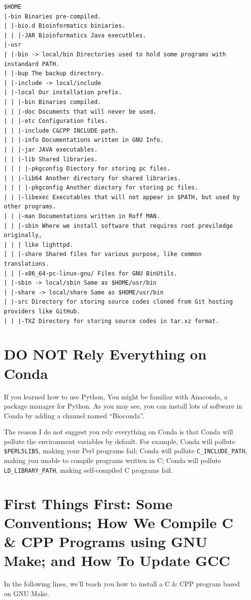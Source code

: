 \documentclass[]{article}
\begin{document}
\begin{verbatim}
$HOME
|-bin Binaries pre-compiled.
| |-bio.d Bioinformatics biniaries.
| | |-JAR Bioinformatics Java executbles.
|-usr
| |-bin -> local/bin Directories used to hold some programs with instandard PATH.
| |-bup The backup directory.
| |-include -> local/include
| |-local Our installation prefix.
| | |-bin Binaries compiled.
| | |-doc Documents that will never be used.
| | |-etc Configuration files.
| | |-include C&CPP INCLUDE path.
| | |-info Documentations written in GNU Info.
| | |-jar JAVA executables.
| | |-lib Shared libraries.
| | | |-pkgconfig Diectory for storing pc files.
| | |-lib64 Another directory for shared libraries.
| | | |-pkgconfig Another diectory for storing pc files.
| | |-libexec Executables that will not appear in $PATH, but used by other programs.
| | |-man Documentations written in Roff MAN.
| | |-sbin Where we install software that requires root previledge originally,
| | | like lighttpd. 
| | |-share Shared files for various purpose, like common translations.
| | |-x86_64-pc-linux-gnu/ Files for GNU BinUtils.
| |-sbin -> local/sbin Same as $HOME/usr/bin
| |-share -> local/share Same as $HOME/usr/bin
| |-src Directory for storing source codes cloned from Git hosting providers like GitHub.
| | |-TXZ Directory for storing source codes in tar.xz format.
\end{verbatim}

\section{DO NOT Rely Everything on Conda}
If you learned how to use Python, You might be familiar with Anaconda, a package manager for Python. As you may see, you can install lots of software in Conda by adding a channel named ``Bioconda''. 

The reason I do not suggest you rely everything on Conda is that Conda will pollute the environment variables by default. For example, Conda will pollute \verb|$PERL5LIBS|, making your Perl programs fail; Conda will pollute \verb|C_INCLUDE_PATH|, making you unable to compile programs written in C; Conda will pollute \verb|LD_LIBRARY_PATH|, making self-compiled C programs fail.

\section[First Things First]{First Things First: Some Conventions; How We Compile C \& CPP Programs using GNU Make; and How To Update GCC}
In the following lines, we'll teach you how to install a C \& CPP program based on GNU Make.
\end{document}
